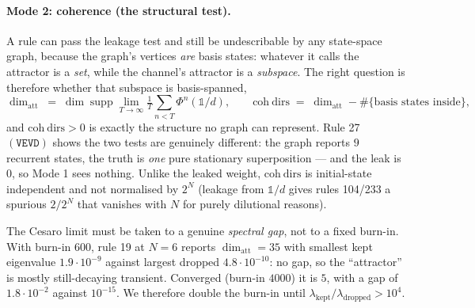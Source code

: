 \documentclass[11pt]{article}
\newcommand{\rt}[1]{\texttt{#1}}
\begin{document}
\paragraph{Mode 2: coherence (the structural test).} A rule can pass the leakage
test and still be undescribable by any state-space graph, because the graph's
vertices \emph{are} basis states: whatever it calls the attractor is a
\emph{set}, while the channel's attractor is a \emph{subspace}. The right
question is therefore whether that subspace is basis-spanned,
\[
  \dim_{\mathrm{att}} \;=\; \dim\operatorname{supp}
  \lim_{T\to\infty}\tfrac1T\sum_{n<T}\Phi^n(\mathbb{1}/d),
  \qquad
  \mathrm{coh\ dirs} \;=\; \dim_{\mathrm{att}} - \#\{\text{basis states inside}\},
\]
and $\mathrm{coh\ dirs}>0$ is exactly the structure no graph can represent.
Rule 27 $(\rt{VEVD})$ shows the two tests are genuinely different: the graph
reports $9$ recurrent states, the truth is \emph{one} pure stationary
superposition --- and the leak is $0$, so Mode 1 sees nothing. Unlike the leaked
weight, $\mathrm{coh\ dirs}$ is initial-state independent and not normalised by
$2^N$ (leakage from $\mathbb{1}/d$ gives rules 104/233 a spurious $2/2^N$ that
vanishes with $N$ for purely dilutional reasons).

The Cesaro limit must be taken to a genuine \emph{spectral gap}, not to a fixed
burn-in. With burn-in $600$, rule 19 at $N=6$ reports $\dim_{\mathrm{att}}=35$
with smallest kept eigenvalue $1.9\cdot10^{-9}$ against largest dropped
$4.8\cdot10^{-10}$: no gap, so the ``attractor'' is mostly still-decaying
transient. Converged (burn-in $4000$) it is $5$, with a gap of $1.8\cdot10^{-2}$
against $10^{-15}$. We therefore double the burn-in until
$\lambda_{\text{kept}}/\lambda_{\text{dropped}}>10^{4}$.
\end{document}
